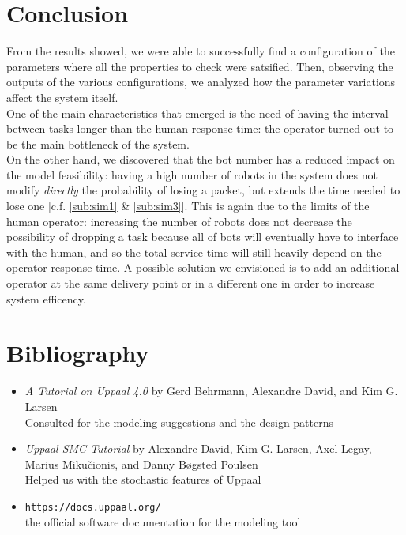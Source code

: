 \documentclass[10pt,a4paper]{article}
\begin{document}
	\section{Conclusion}
		From the results showed, we were able to successfully find a configuration of the parameters where all the properties to check were satsified. Then, observing the outputs of the various configurations, we analyzed how the parameter variations affect the system itself.\\
		One of the main characteristics that emerged is the need of having the interval between tasks longer than the human response time: the operator turned out to be the main bottleneck of the system.\\
		On the other hand, we discovered that the bot number has a reduced impact on the model feasibility: having a high number of robots in the system does not modify \emph{directly} the probability of losing a packet, but extends the time needed to lose one [c.f. \ref{sub:sim1} \& \ref{sub:sim3}]. This is again due to the limits of the human operator: increasing the number of robots does not decrease the possibility of dropping a task because all of bots will eventually have to interface with the human, and so the total service time will still heavily depend on the operator response time. A possible solution we envisioned is to add an additional operator at the same delivery point or in a different one in order to increase system efficency. 
	
	\section{Bibliography}
		\begin{itemize}
			\item \emph{A Tutorial on Uppaal 4.0} by Gerd Behrmann, Alexandre David, and Kim G. Larsen \\
				Consulted for the modeling suggestions and the design patterns
			\item \emph{Uppaal SMC Tutorial} by Alexandre David, Kim G. Larsen, Axel Legay, Marius Mikučionis, and Danny Bøgsted Poulsen \\
				Helped us with the stochastic features of Uppaal
			\item \verb|https://docs.uppaal.org/| \\ the official software documentation for the modeling tool
		\end{itemize}
		
\end{document}
